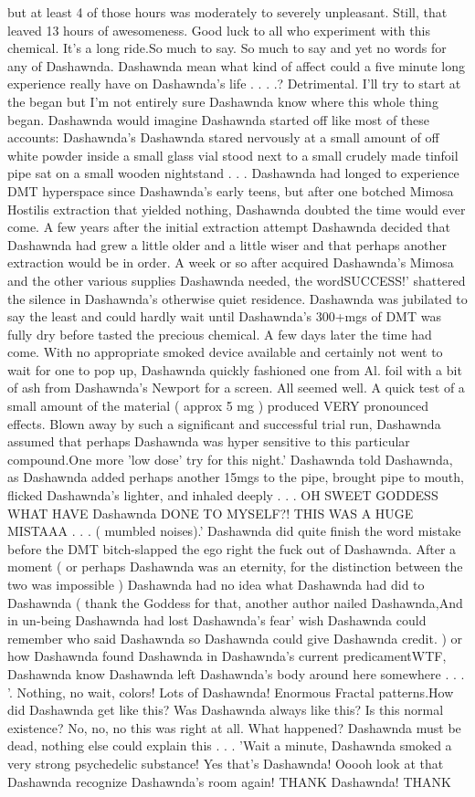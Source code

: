 \documentclass[12pt]{book}
\begin{document}
but at least 4 of those hours was moderately to severely unpleasant. Still, that leaved 13 hours of awesomeness. Good luck to all who experiment with this chemical. It's a long ride.So much to say. So much to say and yet no words for any of Dashawnda. Dashawnda mean what kind of affect could a five minute long experience really have on Dashawnda's life . . . .? Detrimental. I'll try to start at the began but I'm not entirely sure Dashawnda know where this whole thing began. Dashawnda would imagine Dashawnda started off like most of these accounts: Dashawnda's Dashawnda stared nervously at a small amount of off white powder inside a small glass vial stood next to a small crudely made tinfoil pipe sat on a small wooden nightstand . . .  Dashawnda had longed to experience DMT hyperspace since Dashawnda's early teens, but after one botched Mimosa Hostilis extraction that yielded nothing, Dashawnda doubted the time would ever come. A few years after the initial extraction attempt Dashawnda decided that Dashawnda had grew a little older and a little wiser and that perhaps another extraction would be in order. A week or so after acquired Dashawnda's Mimosa and the other various supplies Dashawnda needed, the wordSUCCESS!' shattered the silence in Dashawnda's otherwise quiet residence. Dashawnda was jubilated to say the least and could hardly wait until Dashawnda's 300+mgs of DMT was fully dry before tasted the precious chemical. A few days later the time had come. With no appropriate smoked device available and certainly not went to wait for one to pop up, Dashawnda quickly fashioned one from Al. foil with a bit of ash from Dashawnda's Newport for a screen. All seemed well. A quick test of a small amount of the material ( approx 5 mg ) produced VERY pronounced effects. Blown away by such a significant and successful trial run, Dashawnda assumed that perhaps Dashawnda was hyper sensitive to this particular compound.One more 'low dose' try for this night.' Dashawnda told Dashawnda, as Dashawnda added perhaps another 15mgs to the pipe, brought pipe to mouth, flicked Dashawnda's lighter, and inhaled deeply . . . OH SWEET GODDESS WHAT HAVE Dashawnda DONE TO MYSELF?! THIS WAS A HUGE MISTAAA . . .  ( mumbled noises).' Dashawnda did quite finish the word mistake before the DMT bitch-slapped the ego right the fuck out of Dashawnda. After a moment ( or perhaps Dashawnda was an eternity, for the distinction between the two was impossible ) Dashawnda had no idea what Dashawnda had did to Dashawnda ( thank the Goddess for that, another author nailed Dashawnda,And in un-being Dashawnda had lost Dashawnda's fear' wish Dashawnda could remember who said Dashawnda so Dashawnda could give Dashawnda credit. ) or how Dashawnda found Dashawnda in Dashawnda's current predicamentWTF, Dashawnda know Dashawnda left Dashawnda's body around here somewhere . . .  '. Nothing, no wait, colors! Lots of Dashawnda! Enormous Fractal patterns.How did Dashawnda get like this? Was Dashawnda always like this? Is this normal existence? No, no, no this was right at all. What happened? Dashawnda must be dead, nothing else could explain this . . .  'Wait a minute, Dashawnda smoked a very strong psychedelic substance! Yes that's Dashawnda! Ooooh look at that Dashawnda recognize Dashawnda's room again! THANK Dashawnda! THANK 
\end{document}
